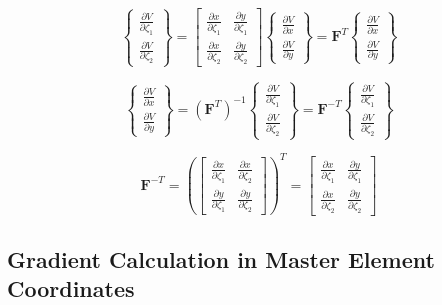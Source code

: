 \documentclass[
  11pt,
  a4paper,
]{scrbook}
\begin{document}
\[\begin{Bmatrix} \frac{\partial V}{\partial \zeta_1} \\ \frac{\partial V}{\partial \zeta_2} \end{Bmatrix} = \begin{bmatrix} \frac{\partial x}{\partial \zeta_1} & \frac{\partial y}{\partial \zeta_1} \\ \frac{\partial x}{\partial \zeta_2} & \frac{\partial y}{\partial \zeta_2} \end{bmatrix} \begin{Bmatrix} \frac{\partial V}{\partial x} \\ \frac{\partial V}{\partial y} \end{Bmatrix} = \mathbf{F}^T \begin{Bmatrix} \frac{\partial V}{\partial x} \\ \frac{\partial V}{\partial y} \end{Bmatrix}\]

\[\begin{Bmatrix} \frac{\partial V}{\partial x} \\ \frac{\partial V}{\partial y} \end{Bmatrix} = (\mathbf{F}^T)^{-1} \begin{Bmatrix} \frac{\partial V}{\partial \zeta_1} \\ \frac{\partial V}{\partial \zeta_2} \end{Bmatrix} = \mathbf{F}^{-T} \begin{Bmatrix} \frac{\partial V}{\partial \zeta_1} \\ \frac{\partial V}{\partial \zeta_2} \end{Bmatrix}\]

\[\mathbf{F}^{-T} = \left(\begin{bmatrix} \frac{\partial x}{\partial \zeta_1} & \frac{\partial x}{\partial \zeta_2} \\ \frac{\partial y}{\partial \zeta_1} & \frac{\partial y}{\partial \zeta_2} \end{bmatrix}\right)^T = \begin{bmatrix} \frac{\partial x}{\partial \zeta_1} & \frac{\partial y}{\partial \zeta_1} \\ \frac{\partial x}{\partial \zeta_2} & \frac{\partial y}{\partial \zeta_2} \end{bmatrix}\]

\subsection{Gradient Calculation in Master Element
Coordinates}\label{gradient-calculation-in-master-element-coordinates}
\end{document}
